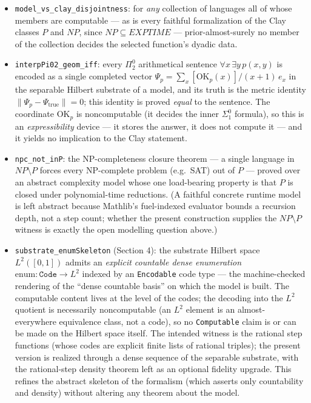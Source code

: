 \documentclass[11pt,a4paper]{report}
\begin{document}
\begin{itemize}
  machine-checked correctness proof).
\item
  \texttt{model\_vs\_clay\_disjointness}: for \emph{any} collection of
  languages all of whose members are computable --- as is every faithful
  formalization of the Clay classes \(P\) and \(NP\), since
  \(NP \subseteq EXPTIME\) --- prior-almost-surely no member of the
  collection decides the selected function's dyadic data.
\item
  \texttt{interpPi02\_geom\_iff}: every \(\Pi^0_2\) arithmetical sentence
  \(\forall x\,\exists y\,p(x,y)\) is encoded as a single completed vector
  \(\Psi_p = \sum_x [\mathrm{OK}_p(x)]/(x+1)\,e_x\) in the separable Hilbert
  substrate of a model, and its truth is the metric identity
  \(\lVert \Psi_p - \Psi_{\mathrm{true}}\rVert = 0\); this identity is proved
  \emph{equal} to the sentence. The coordinate \(\mathrm{OK}_p\) is
  noncomputable (it decides the inner \(\Sigma^0_1\) formula), so this is an
  \emph{expressibility} device --- it stores the answer, it does not compute it
  --- and it yields no implication to the Clay statement.
\item
  \texttt{npc\_not\_inP}: the NP-completeness closure theorem --- a single
  language in \(NP \setminus P\) forces every NP-complete problem (e.g.\ SAT)
  out of \(P\) --- proved over an abstract complexity model whose one
  load-bearing property is that \(P\) is closed under polynomial-time
  reductions. (A faithful concrete runtime model is left abstract because
  Mathlib's fuel-indexed evaluator bounds a recursion depth, not a step count;
  whether the present construction supplies the \(NP \setminus P\) witness is
  exactly the open modelling question above.)
\item
  \texttt{substrate\_enumSkeleton} (Section 4): the substrate Hilbert space
  \(L^{2}([0,1])\) admits an \emph{explicit countable dense enumeration}
  \(\mathrm{enum}\colon \texttt{Code} \to L^{2}\) indexed by an
  \texttt{Encodable} code type --- the machine-checked rendering of the
  ``dense countable basis'' on which the model is built. The computable content
  lives at the level of the codes; the decoding into the \(L^{2}\) quotient is
  necessarily noncomputable (an \(L^{2}\) element is an almost-everywhere
  equivalence class, not a code), so no \texttt{Computable} claim is or can be
  made on the Hilbert space itself. The intended witness is the rational step
  functions (whose codes are explicit finite lists of rational triples); the
  present version is realized through a dense sequence of the separable
  substrate, with the rational-step density theorem left as an optional fidelity
  upgrade. This refines the abstract skeleton of the formalism (which asserts
  only countability and density) without altering any theorem about the model.
\end{itemize}
\end{document}

